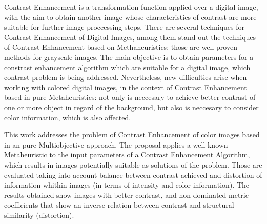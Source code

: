 
\begin{foreignabstract}
Contrast Enhancement is a transformation function applied over a digital image, with the aim to obtain another image whose characteristics of contrast are more suitable for further image proccessing steps. There are several techniques for Contrast Enhancement of Digital Images, among them stand out the techniques of Contrast Enhancement based on Methaheuristics; those are well proven methods for grayscale images. The main objective is to obtain parameters for a constrast enhancement algorithm which are suitable for a digital image, which contrast problem is being addressed. Nevertheless, new difficulties arise when working with colored digital images, in the context of Contrast Enhancement based in pure Metaheuristics: not only is neccesary to achieve better contrast of one or more object in regard of the background, but also is neccesary to consider color information, which is also affected. 

This work addresses the problem of Contrast Enhancement of color images based in an pure Multiobjective approach. The proposal applies a well-known Metaheuristic to the input parameters of a Contrast Enhancement Algorithm, which results in images potentially suitable as solutions of the problem. Those are evaluated taking into account balance between contrast achieved and distortion of information whithin images (in terms of intensity and color information). The results obtained show images with better contrast, and non-dominated metric coefficients that show an inverse relation between contrast and structural similarity (distortion).


\end{foreignabstract}
